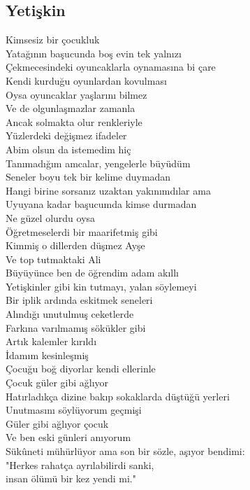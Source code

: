 \subsection{Yetişkin}

Kimsesiz bir çocukluk \\
Yatağının başucunda boş evin tek yalnızı \\
Çekmecesindeki oyuncaklarla oynamasına bi çare \\
Kendi kurduğu oyunlardan kovulması \\
Oysa oyuncaklar yaşlarını bilmez \\
Ve de olgunlaşmazlar zamanla \\
Ancak solmakta olur renkleriyle \\
Yüzlerdeki değişmez ifadeler \\

\noindent\newline
Abim olsun da istemedim hiç \\
Tanımadığım amcalar, yengelerle büyüdüm \\
Seneler boyu tek bir kelime duymadan \\
Hangi birine sorsanız uzaktan yakınımdılar ama \\
Uyuyana kadar başucumda kimse durmadan \\

\noindent\newline
Ne güzel olurdu oysa \\
Öğretmeselerdi bir maarifetmiş gibi \\
Kimmiş o dillerden düşmez Ayşe \\
Ve top tutmaktaki Ali \\
Büyüyünce ben de öğrendim adam akıllı \\
Yetişkinler gibi kin tutmayı, yalan söylemeyi \\
Bir iplik ardında eskitmek seneleri \\
Alındığı unutulmuş ceketlerde \\
Farkına varılmamış sökükler gibi \\

\noindent\newline
Artık kalemler kırıldı \\
İdamım kesinleşmiş \\
Çocuğu boğ diyorlar kendi ellerinle \\
Çocuk güler gibi ağlıyor \\
Hatırladıkça dizine bakıp sokaklarda düştüğü yerleri \\
Unutmasını söylüyorum geçmişi \\
Güler gibi ağlıyor çocuk \\
Ve ben eski günleri anıyorum \\
Sükûneti mühürlüyor ama son bir sözle, aşıyor bendimi: \\
	"Herkes rahatça ayrılabilirdi sanki, \\
		insan ölümü bir kez yendi mi." \\
